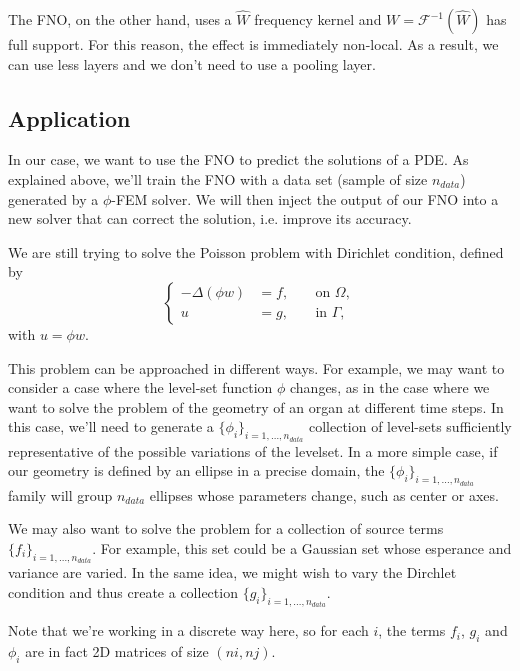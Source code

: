 The FNO, on the other hand, uses a $\hat{W}$ frequency kernel and $W=\mathcal{F}^{-1}(\hat{W})$ has full support. For this reason, the effect is immediately non-local. As a result, we can use less layers and we don't need to use a pooling layer.

\subsection{Application} \label{FNO.application}

In our case, we want to use the FNO to predict the solutions of a PDE. As explained above, we'll train the FNO with a data set (sample of size $n_{data}$) generated by a $\phi$-FEM solver. We will then inject the output of our FNO into a new solver that can correct the solution, i.e. improve its accuracy. 

We are still trying to solve the Poisson problem with Dirichlet condition, defined by
\begin{equation*}
	\left\{\begin{aligned}
		-\Delta (\phi w)&=f, \; &&\text{on } \Omega, \\
		u&=g, \; &&\text{in } \Gamma,
	\end{aligned}\right.
\end{equation*}
with $u=\phi w$.

This problem can be approached in different ways.
For example, we may want to consider a case where the level-set function $\phi$ changes, as in the case where we want to solve the problem of the geometry of an organ at different time steps. In this case, we'll need to generate a $\{\phi_i\}_{i=1,\dots,n_{data}}$ collection of level-sets sufficiently representative of the possible variations of the levelset. In a more simple case, if our geometry is defined by an ellipse in a precise domain, the $\{\phi_i\}_{i=1,\dots,n_{data}}$ family will group $n_{data}$ ellipses whose parameters change, such as center or axes.

We may also want to solve the problem for a collection of source terms $\{f_i\}_{i=1,\dots,n_{data}}$. For example, this set could be a Gaussian set whose esperance and variance are varied. In the same idea, we might wish to vary the Dirchlet condition and thus create a collection $\{g_i\}_{i=1,\dots,n_{data}}$.

\begin{Rem}
	Note that we're working in a discrete way here, so for each $i$, the terms $f_i$, $g_i$ and $\phi_i$ are in fact 2D matrices of size $(ni,nj)$.
\end{Rem}

